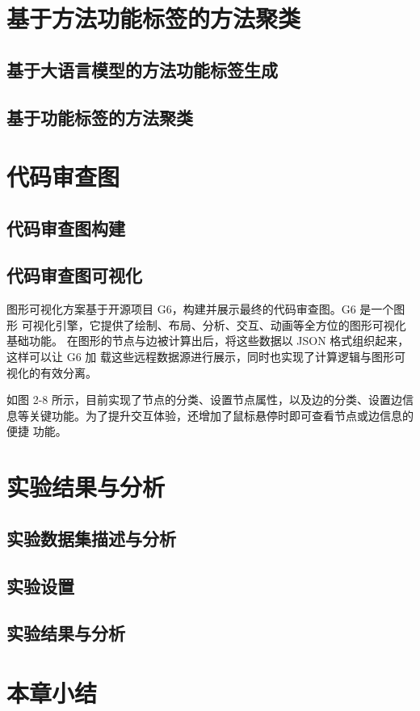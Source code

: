 \section{基于方法功能标签的方法聚类}
\subsection{基于大语言模型的方法功能标签生成}
\subsection{基于功能标签的方法聚类}

\section{代码审查图}
\subsection{代码审查图构建}
\subsection{代码审查图可视化}

图形可视化方案基于开源项目 G6，构建并展示最终的代码审查图。G6 是一个图形
可视化引擎，它提供了绘制、布局、分析、交互、动画等全方位的图形可视化基础功能。
在图形的节点与边被计算出后，将这些数据以 JSON 格式组织起来，这样可以让 G6 加
载这些远程数据源进行展示，同时也实现了计算逻辑与图形可视化的有效分离。


如图 2-8 所示，目前实现了节点的分类、设置节点属性，以及边的分类、设置边信
息等关键功能。为了提升交互体验，还增加了鼠标悬停时即可查看节点或边信息的便捷
功能。

\section{实验结果与分析}

\subsection{实验数据集描述与分析}
\subsection{实验设置}
\subsection{实验结果与分析}

\section{本章小结}





